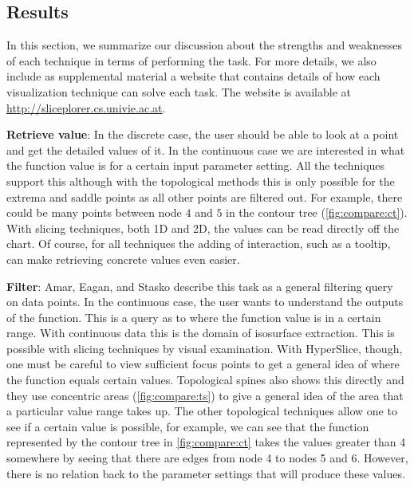 \subsection{Results}\label{sec:task-solutions}

In this section, we summarize our discussion about the strengths and weaknesses
of each technique in terms of performing the task.  For more details, we also
include as supplemental material a website that contains details of how each
visualization technique can solve each task. The website is available at
\url{http://sliceplorer.cs.univie.ac.at}.


\textbf{Retrieve value}:\label{retrieve-value}
In the discrete case, the user should be able to look at a point and get the
detailed values of it. In the continuous case we are interested in what the
function value is for a certain input parameter setting. All the techniques
support this although with the topological methods this is only possible for
the extrema and saddle points as all other points are filtered out. For
example, there could be many points between node $4$ and $5$ in the contour
tree (\autoref{fig:compare:ct}). With
slicing techniques, both 1D and 2D, the values can be read directly off the
chart. Of course, for all techniques the adding of interaction, such as a tooltip, can make retrieving concrete values even easier. 

\textbf{Filter}:\label{filter}
Amar, Eagan, and Stasko describe this task as a general filtering query on data points.
In the continuous case, the user wants to understand the outputs of the
function. This is a query as to where the function value is in a certain range.
With continuous data this is the domain of isosurface extraction.
This is possible with slicing techniques by visual examination.
With HyperSlice, though, one must be careful to view sufficient focus points to
get a general idea of where the function equals certain values.  Topological
spines also shows this directly and they use concentric areas 
(\autoref{fig:compare:ts}) to give a
general idea of the area that a particular value range takes up. The other
topological techniques allow one to see if a certain value is possible, for
example, we can see that the function represented by the contour tree in 
\autoref{fig:compare:ct} takes the values greater than 4 somewhere by seeing 
that there are edges from node 4 to nodes 5 and 6. However,
there is no relation back to the parameter settings that will produce these
values. 

